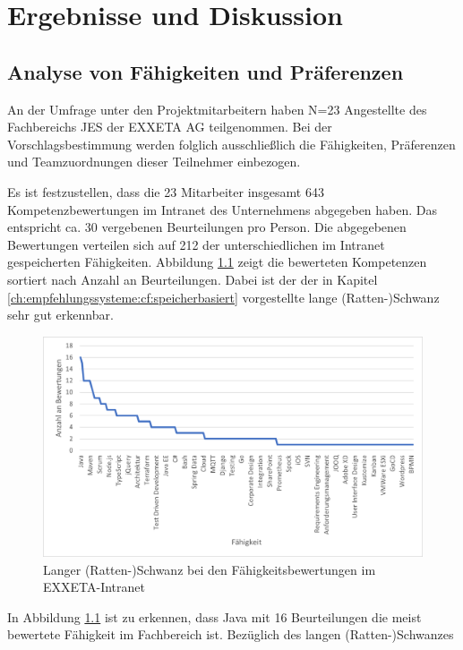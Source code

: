 \chapter{Ergebnisse und Diskussion}
\label{ch:diskussion}

\section{Analyse von Fähigkeiten und Präferenzen}
\label{ch:diskussion:analyse}
An der Umfrage unter den Projektmitarbeitern haben N=23 Angestellte des Fachbereichs \acl{JES} der EXXETA AG teilgenommen. Bei der Vorschlagsbestimmung werden folglich ausschließlich die Fähigkeiten, Präferenzen und Teamzuordnungen dieser Teilnehmer einbezogen.

Es ist festzustellen, dass die 23 Mitarbeiter insgesamt 643 Kompetenzbewertungen im Intranet des Unternehmens abgegeben haben. Das entspricht ca. 30 vergebenen Beurteilungen pro Person. Die abgegebenen Bewertungen verteilen sich auf 212 der \anzFaehigkeiten unterschiedlichen im Intranet gespeicherten Fähigkeiten. Abbildung \ref{fig:diskussion:analyse:abb1} zeigt die bewerteten Kompetenzen sortiert nach Anzahl an Beurteilungen. Dabei ist der der in Kapitel \ref{ch:empfehlungssysteme:cf:speicherbasiert} vorgestellte lange (Ratten-)Schwanz sehr gut erkennbar.

\begin{figure}[h]
	\centering
	\includegraphics[width=1\textwidth]{gfx/long-tail-intranet.png}
	\caption{Langer (Ratten-)Schwanz bei den Fähigkeitsbewertungen im EXXETA-Intranet}
	\label{fig:diskussion:analyse:abb1}
\end{figure}

In Abbildung \ref{fig:diskussion:analyse:abb1} ist zu erkennen, dass Java mit 16 Beurteilungen die meist bewertete Fähigkeit im Fachbereich ist. Bezüglich des langen (Ratten-)Schwanzes
\newpage

